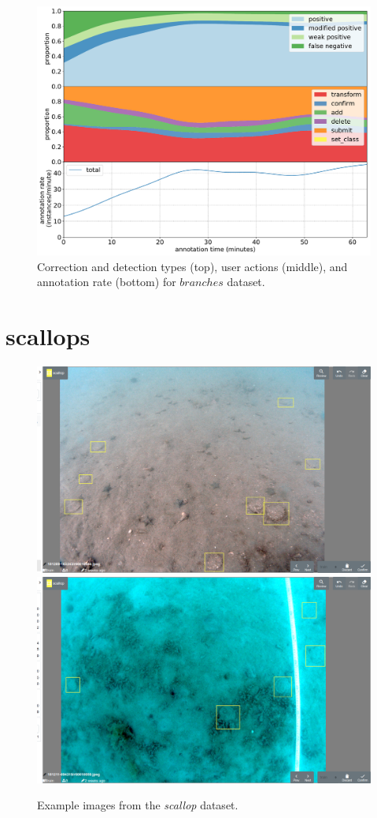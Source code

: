 \begin{figure}[!h]
\centering
\includegraphics[width=1.0\linewidth]{charts/action_annotations/branches.pdf}
\caption{Correction and detection types (top), user actions (middle), and annotation rate (bottom) for $branches$ dataset.}
\label{fig:branches_annotation}
\end{figure}

\pagebreak
\section {scallops}
\label{sec:scallop_details}


\begin{figure}[!h]
  \includegraphics[width=0.475\linewidth]{figures/annotation/screenshots/scallops.png}
  \hfill
  \includegraphics[width=0.475\linewidth]{figures/annotation/screenshots/scallops3.png}
\caption{Example images from the \emph{scallop} dataset.}
\label{fig:scallop_dataset}  
\end{figure}


